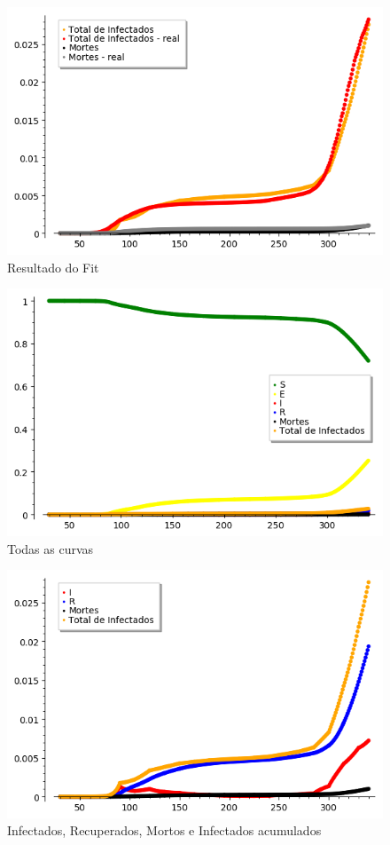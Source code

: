 \documentclass{article}
\begin{document}
\begin{figure}[H]
    \centering
    \includegraphics[scale = 0.7]{Imagens/DTDrTr.png}
    \caption{Resultado do Fit}
    \label{fit}
\end{figure}

\begin{figure}[H]
    \centering
    \includegraphics[scale = 0.7]{Imagens/SEIRDT.png}
    \caption{Todas as curvas}
    \label{resultados}
\end{figure}

\begin{figure}[H]
    \centering
    \includegraphics[scale = 0.7]{Imagens/IRDT.png}
    \caption{Infectados, Recuperados, Mortos e Infectados acumulados}
    \label{IRDT}
\end{figure}
\end{document}
